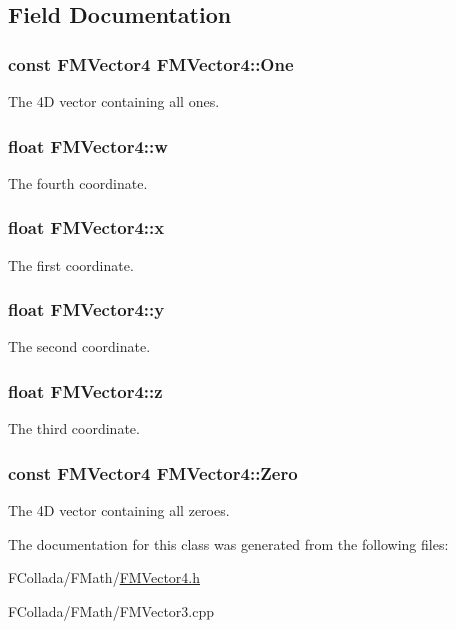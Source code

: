 \subsection{Field Documentation}
\hypertarget{classFMVector4_ae76b0f45630d1c2ff5f14409c15357ac}{
\subsubsection[{One}]{\setlength{\rightskip}{0pt plus 5cm}const {\bf FMVector4} {\bf FMVector4::One}}}
\label{classFMVector4_ae76b0f45630d1c2ff5f14409c15357ac}
The 4D vector containing all ones. \hypertarget{classFMVector4_a38311f6dd1139e792d6fad137572a82a}{
\subsubsection[{w}]{\setlength{\rightskip}{0pt plus 5cm}float {\bf FMVector4::w}}}
\label{classFMVector4_a38311f6dd1139e792d6fad137572a82a}
The fourth coordinate. \hypertarget{classFMVector4_afe5d4e4d762d99547c6c4ba2e2f336db}{
\subsubsection[{x}]{\setlength{\rightskip}{0pt plus 5cm}float {\bf FMVector4::x}}}
\label{classFMVector4_afe5d4e4d762d99547c6c4ba2e2f336db}
The first coordinate. \hypertarget{classFMVector4_a36567c972039925e7ee11faa69ddd5ab}{
\subsubsection[{y}]{\setlength{\rightskip}{0pt plus 5cm}float {\bf FMVector4::y}}}
\label{classFMVector4_a36567c972039925e7ee11faa69ddd5ab}
The second coordinate. \hypertarget{classFMVector4_aa86685f8bdb9b6ce80edd1b4424475b8}{
\subsubsection[{z}]{\setlength{\rightskip}{0pt plus 5cm}float {\bf FMVector4::z}}}
\label{classFMVector4_aa86685f8bdb9b6ce80edd1b4424475b8}
The third coordinate. \hypertarget{classFMVector4_a98ad0940dc7826de03de889f947a3ef6}{
\subsubsection[{Zero}]{\setlength{\rightskip}{0pt plus 5cm}const {\bf FMVector4} {\bf FMVector4::Zero}}}
\label{classFMVector4_a98ad0940dc7826de03de889f947a3ef6}
The 4D vector containing all zeroes. 

The documentation for this class was generated from the following files:\begin{DoxyCompactItemize}
\item 
FCollada/FMath/\hyperlink{FMVector4_8h}{FMVector4.h}\item 
FCollada/FMath/FMVector3.cpp\end{DoxyCompactItemize}
